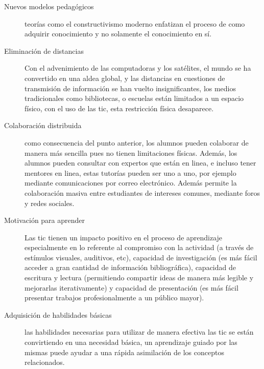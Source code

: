 \begin{description}

    \item[Nuevos modelos pedagógicos] teorías como el constructivismo moderno
	    enfatizan el proceso de como adquirir conocimiento y no solamente el
	    conocimiento en sí.

    \item[Eliminación de distancias] Con el advenimiento de las computadoras y los
	    satélites, el mundo se ha convertido en una aldea global, y las
	    distancias en cuestiones de transmisión de información se han vuelto
	    insignificantes\cite{mohammed2013information}, los medios
	    tradicionales como bibliotecas, o escuelas están limitados a un
	    espacio físico, con el uso de las \Gls{tic}, esta restricción
	    física desaparece\cite{tinio:ict}.

    \item[Colaboración distribuida] como consecuencia del punto anterior, los
	    alumnos pueden colaborar de manera más sencilla pues no tienen
	    limitaciones físicas. Además, los alumnos pueden consultar con
	    expertos que están en linea, e incluso tener mentores en linea,
	    estas tutorías pueden ser uno a uno, por ejemplo mediante
	    comunicaciones por correo electrónico. Además permite la
	    colaboración masiva entre estudiantes de intereses comunes, mediante
	    foros y redes sociales\cite{unesco:ict}.

    \item[Motivación para aprender] Las \Gls{tic} tienen un impacto positivo en
	    el proceso de aprendizaje especialmente en lo referente al
	    compromiso con la actividad (a través de estímulos visuales,
	    auditivos, etc), capacidad de investigación (es más fácil acceder a
	    gran cantidad de información bibliográfica), capacidad de escritura
	    y lectura (permitiendo compartir ideas de manera más legible y
	    mejorarlas iterativamente) y capacidad de presentación (es más fácil
	    presentar trabajos profesionalmente a un público
	    mayor)\cite{passey2004motivational}\cite{egenfeldt2007third}.

    \item[Adquisición de habilidades básicas] las habilidades necesarias para
	    utilizar de manera efectiva las \Gls{tic} se están convirtiendo en
	    una necesidad básica, un aprendizaje guiado por las mismas puede
	    ayudar a una rápida asimilación de los conceptos relacionados.

\end{description}

